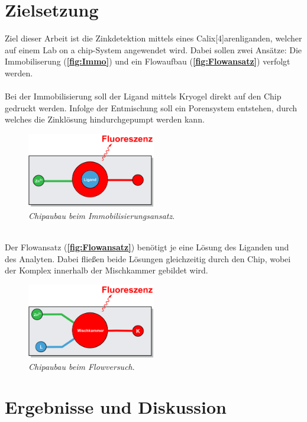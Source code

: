 \documentclass[12pt,a4paper]{report}
\begin{document}
	\chapter{Zielsetzung}
	\noindent Ziel dieser Arbeit ist die Zinkdetektion mittels eines Calix[4]arenliganden, welcher auf einem Lab on a chip-System angewendet wird. Dabei sollen zwei Ansätze: Die \textnormal{Immobiliserung}  (\textbf{\autoref{fig:Immo}}) und ein \textnormal{Flowaufbau} (\textbf{\autoref{fig:Flowansatz}}) verfolgt werden.\\
	\ \\
	Bei der Immobilisierung soll der Ligand mittels Kryogel direkt auf den Chip gedruckt werden. Infolge der Entmischung soll ein Porensystem entstehen, durch welches die Zinklösung hindurchgepumpt werden kann.
	\begin{figure}[h!]
			\centering
			\includegraphics[width=0.5\textwidth]{Immobilisierung.png}
			\caption{\textnormal{\textit{Chipaubau beim Immobilisierungsansatz}.}}
			\label{fig:Immo}
		\end{figure}\\
	Der Flowansatz (\textbf{\autoref{fig:Flowansatz}}) benötigt je eine Lösung des Liganden und des Analyten. Dabei fließen beide Lösungen gleichzeitig durch den Chip, wobei der Komplex innerhalb der Mischkammer gebildet wird. 
	\begin{figure}[h!]
		\centering
		\includegraphics[width=0.5\textwidth]{Flowansatz.png}
		\caption{\textnormal{\textit{Chipaubau beim Flowversuch}.}}
		\label{fig:Flowansatz}
	\end{figure}
	\chapter{Ergebnisse und Diskussion}
\end{document}
